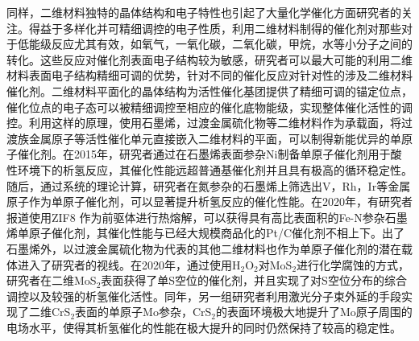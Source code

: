     同样，二维材料独特的晶体结构和电子特性也引起了大量化学催化方面研究者的关注。得益于多样化并可精细调控的电子性质，利用二维材料制得的催化剂对那些对于低能级反应尤其有效，如氧气，一氧化碳，二氧化碳，甲烷，水等小分子之间的转化。这些反应对催化剂表面电子结构较为敏感，研究者可以最大可能的利用二维材料表面电子结构精细可调的优势，针对不同的催化反应对针对性的涉及二维材料催化剂。二维材料平面化的晶体结构为活性催化基团提供了精细可调的锚定位点，催化位点的电子态可以被精细调控至相应的催化底物能级，实现整体催化活性的调控。利用这样的原理，使用石墨烯，过渡金属硫化物等二维材料作为承载面，将过渡族金属原子等活性催化单元直接嵌入二维材料的平面，可以制得新能优异的单原子催化剂。在2015年，研究者通过在石墨烯表面参杂Ni制备单原子催化剂用于酸性环境下的析氢反应，其催化性能远超普通基催化剂并且具有极高的循环稳定性。随后，通过系统的理论计算，研究者在氮参杂的石墨烯上筛选出V，Rh，Ir等金属原子作为单原子催化剂，可以显著提升析氢反应的催化性能。在2020年，有研究者报道使用ZIF8%
    作为前驱体进行热熔解，可以获得具有高比表面积的Fe-N参杂石墨烯单原子催化剂，其催化性能与已经大规模商品化的Pt/C催化剂不相上下。出了石墨烯外，以过渡金属硫化物为代表的其他二维材料也作为单原子催化剂的潜在载体进入了研究者的视线。在2020年，通过使用H$_2$O$_2$对MoS$_2$进行化学腐蚀的方式，研究者在二维MoS$_2$表面获得了单S空位的催化剂，并且实现了对S空位分布的综合调控以及较强的析氢催化活性。同年，另一组研究者利用激光分子束外延的手段实现了二维CrS$_2$表面的单原子Mo参杂，CrS$_2$的表面环境极大地提升了Mo原子周围的电场水平，使得其析氢催化的性能在极大提升的同时仍然保持了较高的稳定性。

